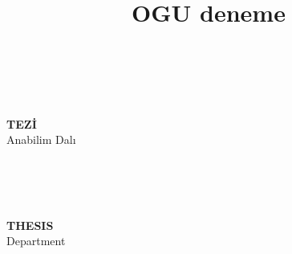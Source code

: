 \documentclass[]{esogu}			%
\begin{document}
\frontmatter %
\title{OGU deneme}
\begin{titlingpage*}
\begin{center}
\footnotesize


	\begin{vplace}							%
	\large									%
	\tbaslik\\								%
	\footnotesize							%

	\vspace{1pc}
	\yazar	\\								%
	\vspace{1pc}
	\textbf{\unvan\space TEZİ}\\
  	\vspace{1pc}
	\bolum \space Anabilim Dalı\\
	\vspace{1pc}
	\teslim\\
	\end{vplace}
\end{center}

\end{titlingpage*}
\begin{titlingpage*}
\begin{center}
\footnotesize


	\begin{vplace}							%
	\large									%
	\tbasliken\\								%
	\footnotesize							%

	\vspace{1pc}
	\yazar	\\								%
	\vspace{1pc}
	\textbf{\unvanen\space THESIS}\\
  	\vspace{1pc}
	\bolumen \space Department\\
	\vspace{1pc}
	\teslimen\\
	\end{vplace}
\end{center}

\end{titlingpage*}
\end{document}
